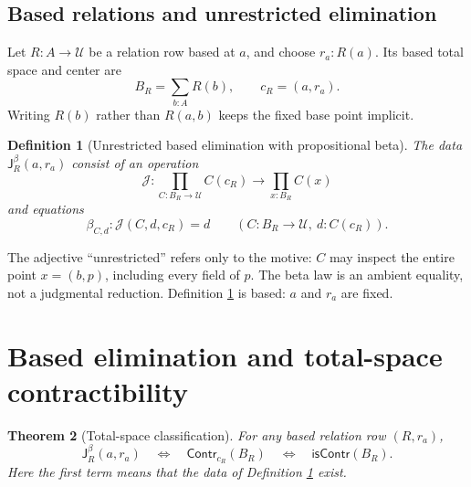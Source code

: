 \documentclass[10pt,reqno]{amsart}
\newtheorem{theorem}{Theorem}[section]
\newtheorem{definition}[theorem]{Definition}
\newcommand{\U}{\mathcal U}
\newcommand{\isContr}{\mathsf{isContr}}
\newcommand{\Contr}{\mathsf{Contr}}
\newcommand{\Jbeta}{\mathsf J^\beta}
\begin{document}
\subsection{Based relations and unrestricted elimination}

Let \(R:A\to\U\) be a relation row based at \(a\), and choose \(r_a:R(a)\).
Its based total space and center are
\[
             B_R=\sum_{b:A}R(b),\qquad c_R=(a,r_a).
\tag{2.5}\label{eq:based-total}
\]
Writing \(R(b)\) rather than \(R(a,b)\) keeps the fixed base point implicit.

\begin{definition}[Unrestricted based elimination with propositional beta]
\label{def:unrestricted}
The data \(\Jbeta_R(a,r_a)\) consist of an operation
\[
 \mathcal J:
   \prod_{C:B_R\to\U}
   C(c_R)\longrightarrow\prod_{x:B_R}C(x)
\tag{2.6}\label{eq:j-data}
\]
and equations
\[
       \beta_{C,d}:\mathcal J(C,d,c_R)=d
       \qquad(C:B_R\to\U,\ d:C(c_R)).
\tag{2.7}\label{eq:j-beta}
\]
\end{definition}

The adjective ``unrestricted'' refers only to the motive: \(C\) may inspect
the entire point \(x=(b,p)\), including every field of \(p\).  The beta law is
an ambient equality, not a judgmental reduction.  Definition
\ref{def:unrestricted} is based: \(a\) and \(r_a\) are fixed.

\section{Based elimination and total-space contractibility}
\label{sec:total-space}

\begin{theorem}[Total-space classification]
\label{thm:j-total}
For any based relation row \((R,r_a)\),
\[
        \Jbeta_R(a,r_a)
        \quad\Longleftrightarrow\quad
        \Contr_{c_R}(B_R)
        \quad\Longleftrightarrow\quad
        \isContr(B_R).
\tag{3.1}\label{eq:j-total}
\]
Here the first term means that the data of Definition
\ref{def:unrestricted} exist.
\end{theorem}
\end{document}
